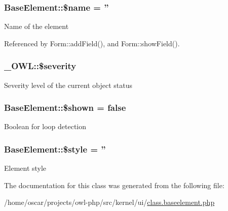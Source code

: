 \subsubsection[{\$name}]{\setlength{\rightskip}{0pt plus 5cm}BaseElement::\$name = ''}\label{classBaseElement_a30b8cff187a9de659a70daf287d66f45}
Name of the element 

Referenced by Form::addField(), and Form::showField().

\subsubsection[{\$severity}]{\setlength{\rightskip}{0pt plus 5cm}\_\-OWL::\$severity}\label{class__OWL_ad26b40a9dbbacb33e299b17826f8327c}
Severity level of the current object status 
\subsubsection[{\$shown}]{\setlength{\rightskip}{0pt plus 5cm}BaseElement::\$shown = false}\label{classBaseElement_ae435cc6d7b4aa9824322ef40ad7450f6}
Boolean for loop detection 
\subsubsection[{\$style}]{\setlength{\rightskip}{0pt plus 5cm}BaseElement::\$style = ''}\label{classBaseElement_a429a3d642dd95f30e1059ef29564b87d}
Element style 

The documentation for this class was generated from the following file:\begin{DoxyCompactItemize}
\item 
/home/oscar/projects/owl-\/php/src/kernel/ui/\hyperlink{class_8baseelement_8php}{class.baseelement.php}\end{DoxyCompactItemize}
